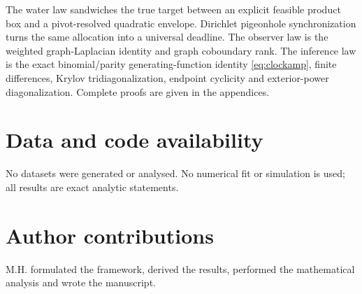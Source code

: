 \documentclass[10pt]{article}
\theoremstyle{definition}
\begin{document}
The water law sandwiches the true target between an explicit feasible
product box and a pivot-resolved quadratic envelope.  Dirichlet pigeonhole
synchronization turns the same allocation into a universal deadline.  The
observer law is the weighted graph-Laplacian identity and graph coboundary
rank.  The inference law is the exact binomial/parity generating-function
identity \eqref{eq:clockamp}, finite differences, Krylov tridiagonalization,
endpoint cyclicity and exterior-power diagonalization.  Complete proofs are
given in the appendices.

\clearpage
\appendix


\section*{Data and code availability}
No datasets were generated or analysed.  No numerical fit or simulation is
used; all results are exact analytic statements.

\section*{Author contributions}
M.H. formulated the framework, derived the results, performed the
mathematical analysis and wrote the manuscript.
\end{document}
